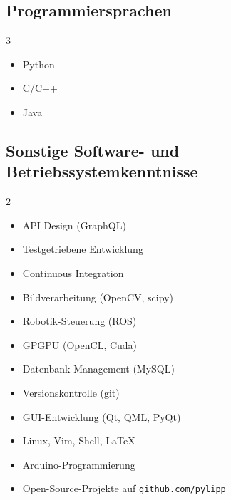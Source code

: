 \documentclass[a4paper,10pt]{memoir}
\begin{document}
\subsection*{Programmiersprachen}
\vspace*{-\baselineskip}
\begin{multicols}{3}
  \begin{itemize}
    \item Python
    \item C/C++
    \item Java
  \end{itemize}
\end{multicols}

\subsection*{Sonstige Software- und Betriebssystemkenntnisse}
\vspace*{-\baselineskip}
\begin{multicols}{2}
  \begin{itemize}
    \item API Design (GraphQL)
    \item Testgetriebene Entwicklung
    \item Continuous Integration
    \item Bildverarbeitung (OpenCV, scipy)
    \item Robotik-Steuerung (ROS)
    \item GPGPU (OpenCL, Cuda)
    \item Datenbank-Management (MySQL)
    \item Versionskontrolle (git)
    \item GUI-Entwicklung (Qt, QML, PyQt)
    \item Linux, Vim, Shell, \LaTeX
    \item Arduino-Programmierung
    \item Open-Source-Projekte auf \texttt{github.com/pylipp}
  \end{itemize}
\end{multicols}
\end{document}

